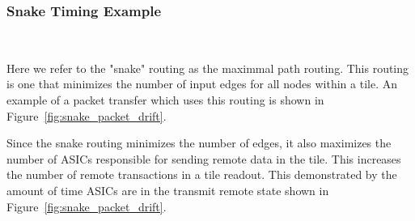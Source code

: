 \subsubsection{Snake Timing Example}~\label{sec:snake_timing}

Here we refer to the "snake" routing as the maximmal path routing.
This routing is one that minimizes the number of input edges for all nodes within a tile.
An example of a packet transfer which uses this routing is shown in Figure~\ref{fig:snake_packet_drift}.

Since the snake routing minimizes the number of edges, it also maximizes the number of ASICs responsible for sending remote data in the tile.
This increases the number of remote transactions in a tile readout.
This demonstrated by the amount of time ASICs are in the transmit remote state shown in Figure~\ref{fig:snake_packet_drift}.

